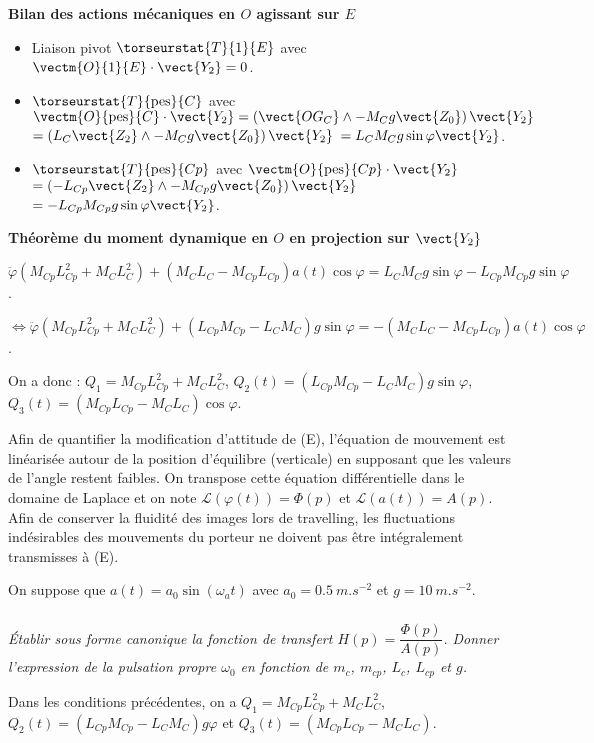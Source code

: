 \begin{multicols}{2}
\begin{corrige}
\textbf{Bilan des actions mécaniques en $O$ agissant sur $E$}
\begin{itemize}
\item Liaison pivot $\torseurstat{T}{1}{E}$ avec $\vectm{O}{1}{E}\cdot \vect{Y_2}=0$. 
\item $\torseurstat{T}{\text{pes}}{C}$ avec $\vectm{O}{\text{pes}}{C}\cdot \vect{Y_2}=\left( \vect{OG_C}\wedge -M_Cg \vect{Z_0}\right) \vect{Y_2}$ $=\left( L_C\vect{Z_2}\wedge -M_Cg \vect{Z_0}\right) \vect{Y_2}$
$= L_CM_Cg \sin \varphi  \vect{Y_2}$. 
\item $\torseurstat{T}{\text{pes}}{Cp}$ avec $\vectm{O}{\text{pes}}{Cp}\cdot \vect{Y_2}$%
$=\left( -L_{Cp}\vect{Z_2}\wedge -M_{Cp}g \vect{Z_0}\right) \vect{Y_2}$
$=- L_{Cp}M_{Cp}g \sin \varphi  \vect{Y_2}$. 
\end{itemize}

\textbf{Théorème du moment dynamique en $O$ en projection sur $\vect{Y_2}$}

$\ddot{\varphi}\left(M_{Cp}L_{Cp}^2+M_{C}L_{C}^2 \right)+\left( M_CL_C-M_{Cp}L_{Cp}\right)  a(t)\cos\varphi =
 L_CM_Cg \sin \varphi- L_{Cp}M_{Cp}g \sin \varphi $.

$\Leftrightarrow \ddot{\varphi}\left(M_{Cp}L_{Cp}^2+M_{C}L_{C}^2 \right)
+\left(   L_{Cp}M_{Cp} - L_CM_C \right)g \sin \varphi=
  - \left( M_CL_C-M_{Cp}L_{Cp}\right)  a(t)\cos\varphi $.

On a donc : 
$Q_1 = M_{Cp}L_{Cp}^2+M_{C}L_{C}^2 $, $Q_2(t)=\left(   L_{Cp}M_{Cp} - L_CM_C \right)g \sin \varphi$, 
$Q_3(t)= \left(M_{Cp}L_{Cp}- M_CL_C\right)  \cos\varphi$.
\end{corrige}
\else
\fi
 
 
\ifprof
\else
Afin de quantifier la modification d’attitude de (E), l'équation de mouvement est linéarisée autour de la position
d'équilibre (verticale) en supposant que les valeurs de l'angle restent faibles. On transpose cette équation
différentielle dans le domaine de Laplace et on note $\mathcal{L}\left(\varphi(t) \right)=\Phi(p)$ et $\mathcal{L}\left(a(t) \right)=A(p)$. 
Afin de conserver la fluidité des images lors de travelling, les fluctuations indésirables des mouvements du porteur ne
doivent pas être intégralement transmisses à (E).

On suppose que $a(t)=a_0\sin \left( \omega_a t\right)$ avec $a_0=\SI{0,5}{m.s^{-2}}$ et $g=\SI{10}{m.s^{-2}}$.
\fi

\subparagraph{}
\textit{Établir sous forme canonique la fonction de transfert $H(p)=\dfrac{\Phi(p)}{A(p)}$. Donner l'expression de la pulsation propre $\omega_0$ en fonction de $m_c$, $m_{cp}$, $L_{c}$, $L_{cp}$ et $g$.}
\ifprof
\begin{corrige}
Dans les conditions précédentes, on a $Q_1 = M_{Cp}L_{Cp}^2+M_{C}L_{C}^2 $, $Q_2(t)=\left(   L_{Cp}M_{Cp} - L_CM_C \right)g  \varphi$ et $Q_3(t)=  \left(M_{Cp}L_{Cp}- M_CL_C\right)$.


\end{corrige}
\end{multicols}
